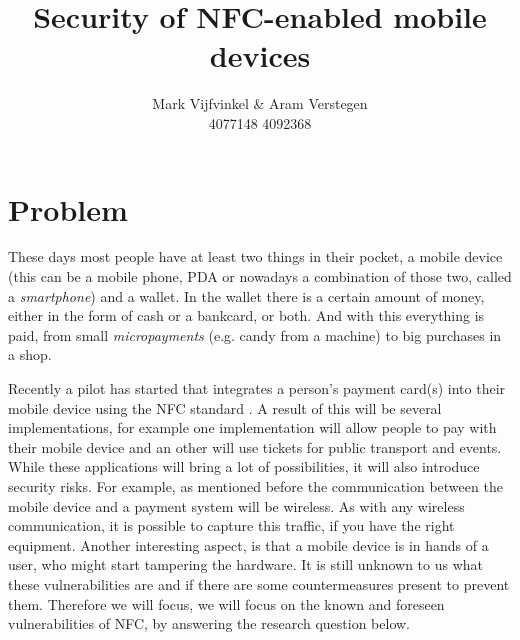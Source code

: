 \documentclass[11pt]{article} %
\title{Security of NFC-enabled mobile devices}
\author{Mark Vijfvinkel \& Aram Verstegen \\ 4077148 4092368}
\date{} %
\begin{document}
\maketitle


\section{Problem}
These days most people have at least two things in their pocket, a mobile device (this can be a mobile phone, PDA or nowadays a combination of those two, called a \textit{smartphone}) and a wallet.
In the wallet there is a certain amount of money, either in the form of cash or a bankcard, or both.
And with this everything is paid, from small \textit{micropayments} (e.g. candy from a machine) to big purchases in a shop.

Recently a pilot has started \cite{payter} that integrates a person's payment card(s) into their mobile device using the NFC standard \cite{nfcstandard}.
A result of this will be several implementations, for example one implementation will allow people to pay with their mobile device and an other will use tickets for public transport and events. 
While these applications will bring a lot of possibilities, it will also introduce security risks. For example, as mentioned before the communication between the mobile device and a payment system will be wireless. As with any wireless communication, it is possible to capture this traffic, if you have the right equipment. Another interesting aspect, is that a mobile device is in hands of a user, who might start tampering the hardware. It is still unknown to us what these vulnerabilities are and if there are some countermeasures present to prevent them. Therefore we will focus, we will focus on the known and foreseen vulnerabilities of NFC, by answering the research question below.
\end{document}
